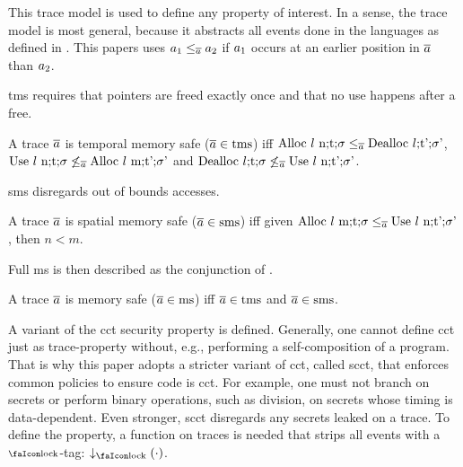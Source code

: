\documentclass[acmsmall,review,screen,dvipsnames]{acmart}
\begin{document}
This trace model is used to define any property of interest.
In a sense, the trace model is most general, because it abstracts all events done in the languages as defined in .
This papers uses $\event[_{1}]\le_{\trace}\event[_{2}]$ if $\event[_{1}]$ occurs at an earlier position in $\trace$ than $\event[_{2}]$.

\gls{tms} requires that pointers are freed exactly once and that no use happens after a free.

\begin{definition}\label{def:trace:tmsdef}
  A trace $\trace$ is temporal memory safe ($\trace\in\tmssafe$) iff $\ev{Alloc\ \loc\ n;\sandboxtag;\securitytag}\le_{\trace}\ev{Dealloc\ \loc;\sandboxtag';\securitytag'}$, $\ev{Use\ \loc\ n;\sandboxtag;\securitytag}\not\le_{\trace}\ev{Alloc\ \loc\ m;\sandboxtag';\securitytag'}$ and $\ev{Dealloc\ \loc;\sandboxtag;\securitytag}\not\le_{\trace}\ev{Use\ \loc\ n;\sandboxtag';\securitytag'}$.
\end{definition}

\gls{sms} disregards out of bounds accesses.

\begin{definition}\label{def:trace:smsdef}
  A trace $\trace$ is spatial memory safe ($\trace\in\smssafe$) iff given $\ev{Alloc\ \loc\ m;\sandboxtag;\securitytag}\le_{\trace}\ev{Use\ \loc\ n;\sandboxtag';\securitytag'}$, then $n<m$.
\end{definition}

Full \gls{ms} is then described as the conjunction of .

\begin{definition}[\glsfirst{ms}]\label{def:trace:msdef}
  A trace $\trace$ is memory safe ($\trace\in\mssafe$) iff $\trace\in\tmssafe$ and $\trace\in\smssafe$.
\end{definition}

A variant of the \gls{cct} security property is defined.
Generally, one cannot define \gls{cct} just as trace-property without, e.g., performing a self-composition of a program.
That is why this paper adopts a stricter variant of \gls{cct}, called \gls{scct}, that enforces common policies to ensure code is \gls{cct}.
For example, one must not branch on secrets or perform binary operations, such as division, on secrets whose timing is data-dependent.
Even stronger, \gls{scct} disregards any secrets leaked on a trace.
To define the property, a function on traces is needed that strips all events with a $\lock$-tag: $\downarrow_{\lock}(\cdot)$.
\end{document}
